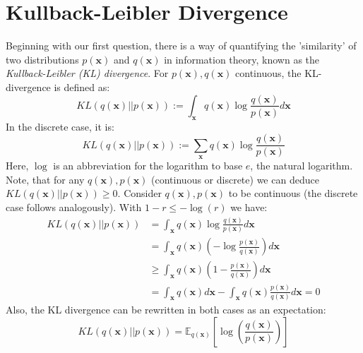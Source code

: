 \documentclass[12pt]{report}
\theoremstyle{definition}
\begin{document}
\section{Kullback-Leibler Divergence}
Beginning with our first question, there is a way of quantifying the 'similarity' of two distributions $p(\mathbf{x})$ and $q(\mathbf{x})$ in information theory, known as the \emph{Kullback-Leibler (KL) divergence}. For $p(\mathbf{x}), q(\mathbf{x})$ continuous, the KL-divergence is defined as:
\begin{equation}
	KL(q(\mathbf{x})||p(\mathbf{x})) := \int_{\mathbf{x}} q(\mathbf{x}) \log \frac{q(\mathbf{x})}{p(\mathbf{x})} d \mathbf{x}
\end{equation}
In the discrete case, it is:
\begin{equation}
	KL(q(\mathbf{x})||p(\mathbf{x})) := \sum_{\mathbf{x}} q(\mathbf{x}) \log \frac{q(\mathbf{x})}{p(\mathbf{x})}
\end{equation}
Here, $\log$ is an abbreviation for the logarithm to base $e$, the natural logarithm. Note, that for any $q(\mathbf{x}), p(\mathbf{x})$ (continuous or discrete) we can deduce $KL(q(\mathbf{x})||p(\mathbf{x})) \geq 0$.
Consider $q(\mathbf{x}), p(\mathbf{x})$ to be continuous (the discrete case follows analogously). With $1 - r \leq -\log(r)$ we have:
\begin{equation}
\begin{split}
KL(q(\mathbf{x})||p(\mathbf{x}))
& = \int_{\mathbf{x}} q(\mathbf{x}) \log \frac{q(\mathbf{x})}{p(\mathbf{x})} d \mathbf{x} \\
& = \int_{\mathbf{x}} q(\mathbf{x}) (- \log \frac{p(\mathbf{x})}{q(\mathbf{x})}) d \mathbf{x} \\
& \geq \int_{\mathbf{x}} q(\mathbf{x}) (1 - \frac{p(\mathbf{x})}{q(\mathbf{x})}) d \mathbf{x} \\
& = \int_{\mathbf{x}} q(\mathbf{x}) d \mathbf{x} - \int_{\mathbf{x}} q(\mathbf{x}) \frac{p(\mathbf{x})}{q(\mathbf{x})} d \mathbf{x} = 0
\end{split}
\end{equation}
Also, the KL divergence can be rewritten in both cases as an expectation:
\begin{equation}
	KL(q(\mathbf{x})||p(\mathbf{x})) = \mathbb{E}_{q(\mathbf{x})}\left[ \log\left(\frac{q(\mathbf{x})}{p(\mathbf{x})} \right) \right]
\end{equation}
\end{document}
